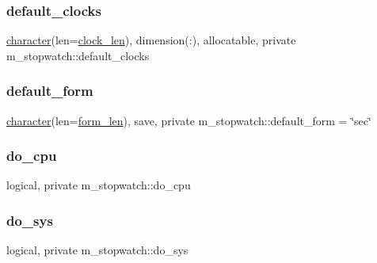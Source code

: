 \subsubsection{\texorpdfstring{default\+\_\+clocks}{default\_clocks}}
{\footnotesize\ttfamily \hyperlink{option__stopwatch_83_8txt_abd4b21fbbd175834027b5224bfe97e66}{character}(len=\hyperlink{namespacem__stopwatch_aa5f2b7700fd32f070e22af9950c47805}{clock\+\_\+len}), dimension(\+:), allocatable, private m\+\_\+stopwatch\+::default\+\_\+clocks\hspace{0.3cm}{\ttfamily [private]}}

\mbox{\label{namespacem__stopwatch_a8bd2994267296dcfb8d6ca82c30e0db3}} 
\subsubsection{\texorpdfstring{default\+\_\+form}{default\_form}}
{\footnotesize\ttfamily \hyperlink{option__stopwatch_83_8txt_abd4b21fbbd175834027b5224bfe97e66}{character}(len=\hyperlink{namespacem__stopwatch_ae96391d876b6e7b05510e339a2e68d20}{form\+\_\+len}), save, private m\+\_\+stopwatch\+::default\+\_\+form = \char`\"{}sec\char`\"{}\hspace{0.3cm}{\ttfamily [private]}}

\mbox{\label{namespacem__stopwatch_a6856aa4d5ac6088d533a30e1087bb9c8}} 
\subsubsection{\texorpdfstring{do\+\_\+cpu}{do\_cpu}}
{\footnotesize\ttfamily logical, private m\+\_\+stopwatch\+::do\+\_\+cpu\hspace{0.3cm}{\ttfamily [private]}}

\mbox{\label{namespacem__stopwatch_a252497fad53bb1f78a57df3a36ecc963}} 
\subsubsection{\texorpdfstring{do\+\_\+sys}{do\_sys}}
{\footnotesize\ttfamily logical, private m\+\_\+stopwatch\+::do\+\_\+sys\hspace{0.3cm}{\ttfamily [private]}}


